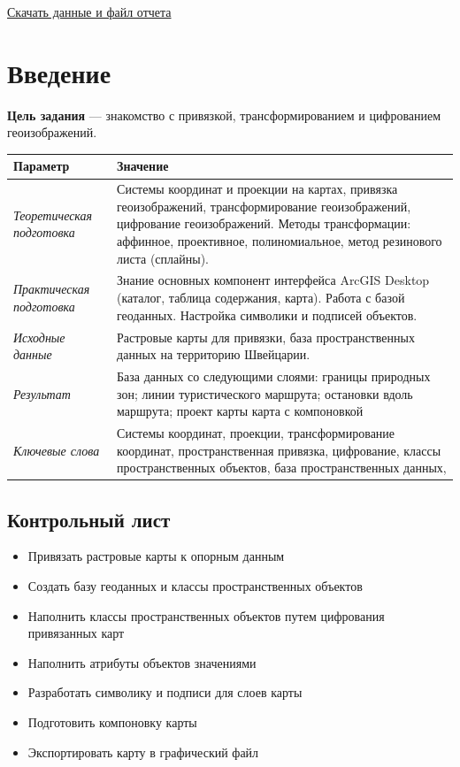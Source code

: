 \documentclass[12pt,]{book}
\providecommand{\tightlist}{%
  \setlength{\itemsep}{0pt}\setlength{\parskip}{0pt}}
\begin{document}
\href{http://autolab.geogr.msu.ru/gis/data/Ex05.zip}{Скачать данные и файл отчета}

\hypertarget{map-ref-general-intro}{%
\section{Введение}\label{map-ref-general-intro}}

\textbf{Цель задания} --- знакомство с привязкой, трансформированием и цифрованием геоизображений.

\begin{longtable}[]{@{}ll@{}}
\toprule
Параметр & Значение\tabularnewline
\midrule
\endhead
\emph{Теоретическая подготовка} & Системы координат и проекции на картах, привязка геоизображений, трансформирование геоизображений, цифрование геоизображений. Методы трансформации: аффинное, проективное, полиномиальное, метод резинового листа (сплайны).\tabularnewline
\emph{Практическая подготовка} & Знание основных компонент интерфейса ArcGIS Desktop (каталог, таблица содержания, карта). Работа с базой геоданных. Настройка символики и подписей объектов.\tabularnewline
\emph{Исходные данные} & Растровые карты для привязки, база пространственных данных на территорию Швейцарии.\tabularnewline
\emph{Результат} & База данных со следующими слоями: границы природных зон; линии туристического маршрута; остановки вдоль маршрута; проект карты карта с компоновкой\tabularnewline
\emph{Ключевые слова} & Системы координат, проекции, трансформирование координат, пространственная привязка, цифрование, классы пространственных объектов, база пространственных данных,\tabularnewline
\bottomrule
\end{longtable}

\hypertarget{map-ref-general-control}{%
\subsection{Контрольный лист}\label{map-ref-general-control}}

\begin{itemize}
\tightlist
\item
  Привязать растровые карты к опорным данным
\item
  Создать базу геоданных и классы пространственных объектов
\item
  Наполнить классы пространственных объектов путем цифрования привязанных карт
\item
  Наполнить атрибуты объектов значениями
\item
  Разработать символику и подписи для слоев карты
\item
  Подготовить компоновку карты
\item
  Экспортировать карту в графический файл
\end{itemize}
\end{document}
